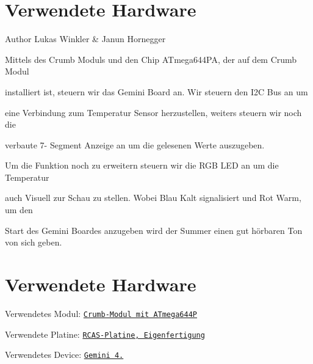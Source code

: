 \hypertarget{index_intro_sec}{}\section{Verwendete Hardware}\label{index_intro_sec}
\begin{DoxyAuthor}{Author}
Lukas Winkler \& Janun Hornegger
\end{DoxyAuthor}
Mittels des Crumb Moduls und den Chip A\-Tmega644\-P\-A, der auf dem Crumb Modul\par
installiert ist, steuern wir das Gemini Board an. Wir steuern den I2\-C Bus an um \par
eine Verbindung zum Temperatur Sensor herzustellen, weiters steuern wir noch die\par
verbaute 7-\/ Segment Anzeige an um die gelesenen Werte auszugeben. \par
Um die Funktion noch zu erweitern steuern wir die R\-G\-B L\-E\-D an um die Temperatur\par
auch Visuell zur Schau zu stellen. Wobei Blau Kalt signalisiert und Rot Warm, um den\par
Start des Gemini Boardes anzugeben wird der Summer einen gut h\"{o}rbaren Ton von sich geben. \par
 \hypertarget{index_intro_sec}{}\section{Verwendete Hardware}\label{index_intro_sec}
Verwendetes Modul\-: \href{http://download.chip45.com/Crumb644_V1.1_infosheet.pdf}{\tt Crumb-\/\-Modul mit A\-Tmega644\-P}\par
Verwendete Platine\-: \href{C:\Arduino\GeminiLight\Platine}{\tt R\-C\-A\-S-\/\-Platine, Eigenfertigung}\par
Verwendetes Device\-: \href{http://www.gemini4.strh.at/}{\tt Gemini 4.}\par
